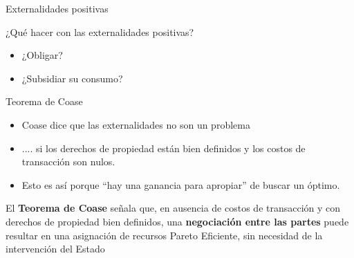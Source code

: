 \documentclass{beamer}
\begin{document}
\begin{frame}{Externalidades positivas}
\begin{figure} [H]
\centering
{}
\end{figure} 
\end{frame}

\begin{frame}{¿Qué hacer con las externalidades positivas?}
    \begin{itemize}
        \item ¿Obligar?
        \vspace{1mm}
        \item ¿Subsidiar su consumo?
    \end{itemize}
\end{frame}


\begin{frame}{Teorema de Coase}
    \begin{itemize}
        \item Coase dice que las externalidades no son un problema
        \item .... si los derechos de propiedad están bien definidos y los costos de transacción son nulos.
        \item Esto es así porque ``hay una ganancia para apropiar'' de buscar un óptimo.
    \end{itemize}
        \begin{boxB}
        \centering
        El \textbf{Teorema de Coase} señala que, en ausencia de costos de transacción y con derechos de propiedad bien definidos, una \textbf{negociación entre las partes }puede resultar en una asignación de recursos Pareto Eficiente, sin necesidad de la intervención del Estado
        \end{boxB}
\end{frame}
\end{document}
